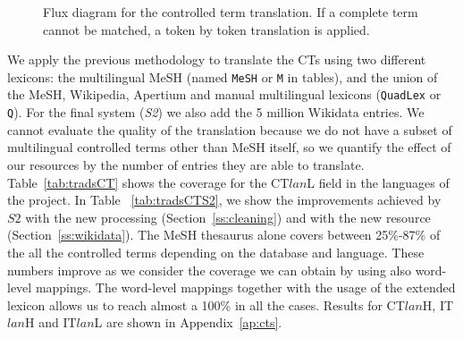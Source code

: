 \documentclass[a4paper,11pt]{article}
\begin{document}
\begin{figure}[t!]
    \caption{Flux diagram for the controlled term translation. If a complete term cannot be matched, a token by token translation is applied.}
    \label{fig:diagram}
\end{figure}

	\bigskip
	We apply the previous methodology to translate the CTs using two different lexicons: the multilingual MeSH (named {\tt MeSH} or {\tt M} in tables), and the union of the MeSH, Wikipedia, Apertium and manual multilingual lexicons ({\tt QuadLex} or {\tt Q}). For the final system (\emph{S2}) we also add the 5 million Wikidata entries. We cannot evaluate the quality of the translation because we do not have a subset of multilingual controlled terms other than MeSH itself, so we quantify the effect of our resources by the number of entries they are able to translate. Table~\ref{tab:tradsCT} shows the coverage for the CT$lan$L field in the languages of the project. In Table ~\ref{tab:tradsCTS2}, we show the improvements achieved by $S2$ with the new processing (Section~\ref{ss:cleaning}) and with the new resource (Section~\ref{ss:wikidata}). The MeSH thesaurus alone covers between 25\%-87\% of the all the controlled terms depending on the database and language. These numbers improve as we consider the coverage we can obtain by using also word-level mappings. %
	The word-level mappings together with the usage of the extended lexicon allows us to reach almost a 100\% in all the cases. Results for CT$lan$H, IT$lan$H and IT$lan$L are shown in Appendix~\ref{ap:cts}.
	
\end{document}
